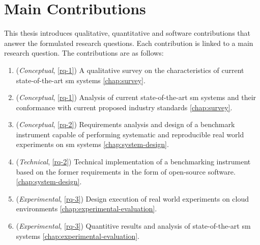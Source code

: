 \section{Main Contributions}
\label{sec:contributions}

This thesis introduces qualitative, quantitative and software contributions that answer the formulated research questions. Each contribution is linked to a main research question. The contributions are as follows:



\begin{enumerate}
    \item (\textit{Conceptual}, \ref{rq-1}) A qualitative survey on the characteristics of current state-of-the-art \gls{sm} systems \cref{chap:survey}.
    
    \item (\textit{Conceptual}, \ref{rq-1}) Analysis of current state-of-the-art \gls{sm} systems and their conformance with current proposed industry standards \cref{chap:survey}.    
    
    \item (\textit{Conceptual}, \ref{rq-2}) Requirements analysis and design of a benchmark instrument capable of performing systematic and reproducible real world experiments on \gls{sm} systems \cref{chap:system-design}.  
    
    \item (\textit{Technical}, \ref{rq-2}) Technical implementation of a benchmarking instrument based on the former requirements in the form of open-source software. \cref{chap:system-design}.

    \item (\textit{Experimental}, \ref{rq-3}) Design execution of real world experiments on cloud environments \cref{chap:experimental-evaluation}.
    
    \item (\textit{Experimental}, \ref{rq-3}) Quantitive results and analysis of state-of-the-art \gls{sm} systems \cref{chap:experimental-evaluation}.
\end{enumerate}


 
